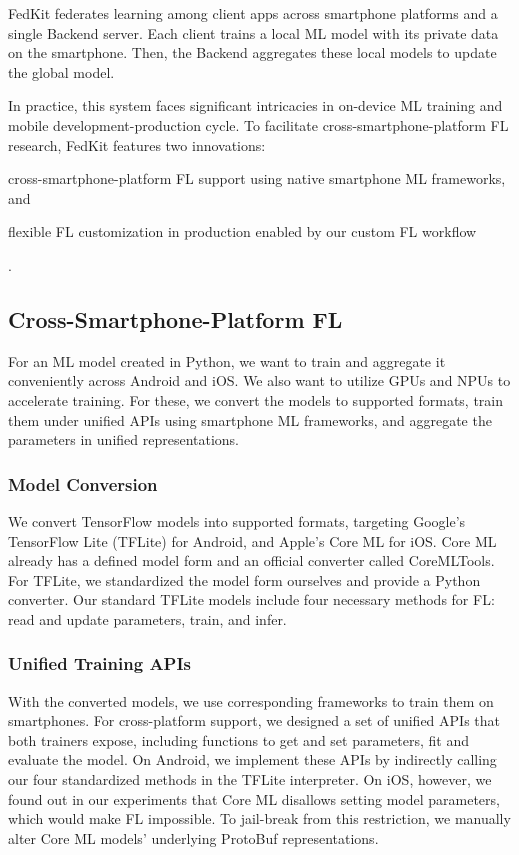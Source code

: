\documentclass[letterpaper]{article} %
\begin{document}
FedKit federates learning among client apps across smartphone platforms and
a single Backend server.
Each client trains a local ML model with its private data on the smartphone.
Then, the Backend aggregates these local models to update the global model.

In practice, this system faces significant intricacies in
on-device ML training and mobile development-production cycle.
To facilitate cross-smartphone-platform FL research,
FedKit features two innovations:
\begin{enumerate*}[label=\arabic*]
    \item cross-smartphone-platform FL support using
        native smartphone ML frameworks, and
    \item flexible FL customization in production enabled by
        our custom FL workflow
\end{enumerate*}.

\subsection{Cross-Smartphone-Platform FL}

For an ML model created in Python,
we want to train and aggregate it conveniently across Android and iOS.
We also want to utilize GPUs and NPUs to accelerate training.
For these, we convert the models to supported formats,
train them under unified APIs using smartphone ML frameworks,
and aggregate the parameters in unified representations.

\subsubsection{Model Conversion}
We convert TensorFlow models into supported formats,
targeting Google's TensorFlow Lite (TFLite) for Android,
and Apple's Core ML for iOS.
Core ML already has a defined model form and an official converter called
CoreMLTools.
For TFLite, we standardized the model form ourselves and
provide a Python converter.
Our standard TFLite models include four necessary methods for FL:
read and update parameters, train, and infer.

\subsubsection{Unified Training APIs}
With the converted models, we use corresponding frameworks to train them
on smartphones.
For cross-platform support,
we designed a set of unified APIs that both trainers expose,
including functions to get and set parameters, fit and evaluate the model.
On Android, we implement these APIs by indirectly calling
our four standardized methods in the TFLite interpreter.
On iOS, however, we found out in our experiments that
Core ML disallows setting model parameters,
which would make FL impossible.
To jail-break from this restriction, we manually alter
Core ML models' underlying ProtoBuf representations.
\end{document}
